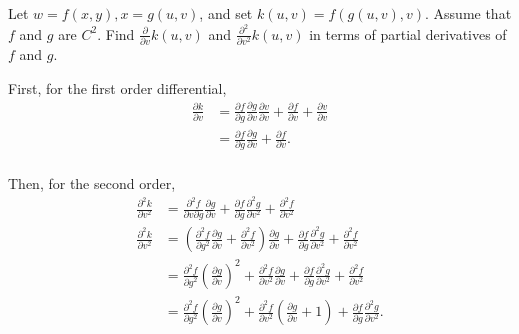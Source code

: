 \documentclass{article}
\begin{document}
  \begin{problem}
    Let $w=f(x,y),x=g(u,v)$, and set  $k(u,v)=f(g(u,v),v)$. Assume that  $f$ and  $g$ are  $C^2$. Find  $\frac{\partial}{\partial v}k(u,v)$ and $\frac{\partial^{2}}{\partial v^2}k(u,v)$ in terms of partial derivatives of $f$ and  $g$.
  \end{problem}

  First, for the first order differential,
  \begin{align*}
    \frac{\partial k}{\partial v}&= \frac{\partial f}{\partial g}\frac{\partial g}{\partial v}\frac{\partial v}{\partial v}+\frac{\partial f}{\partial v}+\frac{\partial v}{\partial v} \\
    &= \frac{\partial f}{\partial g}\frac{\partial g}{\partial v}+\frac{\partial f}{\partial v}. \\
  \end{align*}

  Then, for the second order,
  \begin{align*}
    \frac{\partial^{2} k}{\partial v^2}&= \frac{\partial^2 f}{\partial v \partial g}\frac{\partial g}{\partial v}+\frac{\partial f}{\partial g}\frac{\partial^{2} g}{\partial v^2}+\frac{\partial^{2} f}{\partial v^2} \\
    \frac{\partial^{2} k}{\partial v^2}&= \left( \frac{\partial^{2} f}{\partial g^2}\frac{\partial g}{\partial v}+\frac{\partial^{2} f}{\partial v^2} \right) \frac{\partial g}{\partial v}+\frac{\partial f}{\partial g}\frac{\partial^{2} g}{\partial v^2}+\frac{\partial^{2} f}{\partial v^2} \\
                                       &= \frac{\partial^{2} f}{\partial g^2}{\left( \frac{\partial g}{\partial v} \right) }^2 +\frac{\partial^{2} f}{\partial v^2}\frac{\partial g}{\partial v}+\frac{\partial f}{\partial g}\frac{\partial^{2} g}{\partial v^2}+\frac{\partial^{2} f}{\partial v^2}\\
                                       &= \frac{\partial^{2} f}{\partial g^2}{\left( \frac{\partial g}{\partial v} \right) }^2 +\frac{\partial^{2} f}{\partial v^2}\left(\frac{\partial g}{\partial v}+1\right)+\frac{\partial f}{\partial g}\frac{\partial^{2} g}{\partial v^2}.\\
  \end{align*}
\end{document}
